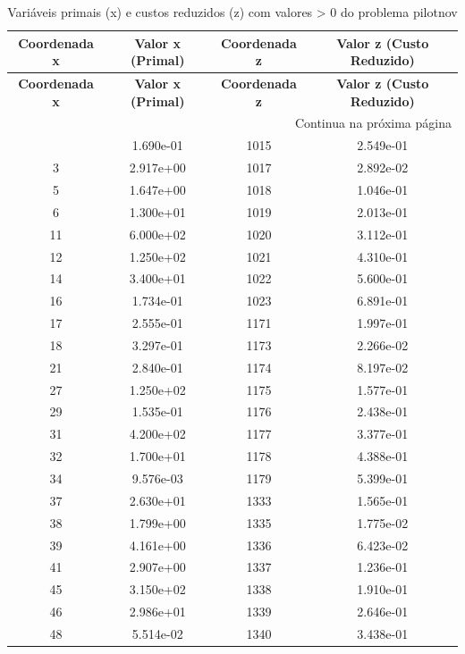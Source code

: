 \documentclass[12pt]{article}
\begin{document}
\begin{longtable}{@{}cccc@{}}
\caption{Variáveis primais (x) e custos reduzidos (z) com valores > 0 do problema pilotnov} \\
\toprule
\textbf{Coordenada x} & \textbf{Valor x (Primal)} & \textbf{Coordenada z} & \textbf{Valor z (Custo Reduzido)} \\
\midrule
\endfirsthead

\toprule
\textbf{Coordenada x} & \textbf{Valor x (Primal)} & \textbf{Coordenada z} & \textbf{Valor z (Custo Reduzido)} \\
\midrule
\endhead

\midrule \multicolumn{4}{r}{{Continua na próxima página}} \\ \midrule
\endfoot

\bottomrule
\endlastfoot
1 & 1.690e-01 & 1015 & 2.549e-01 \\
3 & 2.917e+00 & 1017 & 2.892e-02 \\
5 & 1.647e+00 & 1018 & 1.046e-01 \\
6 & 1.300e+01 & 1019 & 2.013e-01 \\
11 & 6.000e+02 & 1020 & 3.112e-01 \\
12 & 1.250e+02 & 1021 & 4.310e-01 \\
14 & 3.400e+01 & 1022 & 5.600e-01 \\
16 & 1.734e-01 & 1023 & 6.891e-01 \\
17 & 2.555e-01 & 1171 & 1.997e-01 \\
18 & 3.297e-01 & 1173 & 2.266e-02 \\
21 & 2.840e-01 & 1174 & 8.197e-02 \\
27 & 1.250e+02 & 1175 & 1.577e-01 \\
29 & 1.535e-01 & 1176 & 2.438e-01 \\
31 & 4.200e+02 & 1177 & 3.377e-01 \\
32 & 1.700e+01 & 1178 & 4.388e-01 \\
34 & 9.576e-03 & 1179 & 5.399e-01 \\
37 & 2.630e+01 & 1333 & 1.565e-01 \\
38 & 1.799e+00 & 1335 & 1.775e-02 \\
39 & 4.161e+00 & 1336 & 6.423e-02 \\
41 & 2.907e+00 & 1337 & 1.236e-01 \\
45 & 3.150e+02 & 1338 & 1.910e-01 \\
46 & 2.986e+01 & 1339 & 2.646e-01 \\
48 & 5.514e-02 & 1340 & 3.438e-01 \\

\end{longtable}
\end{document}
